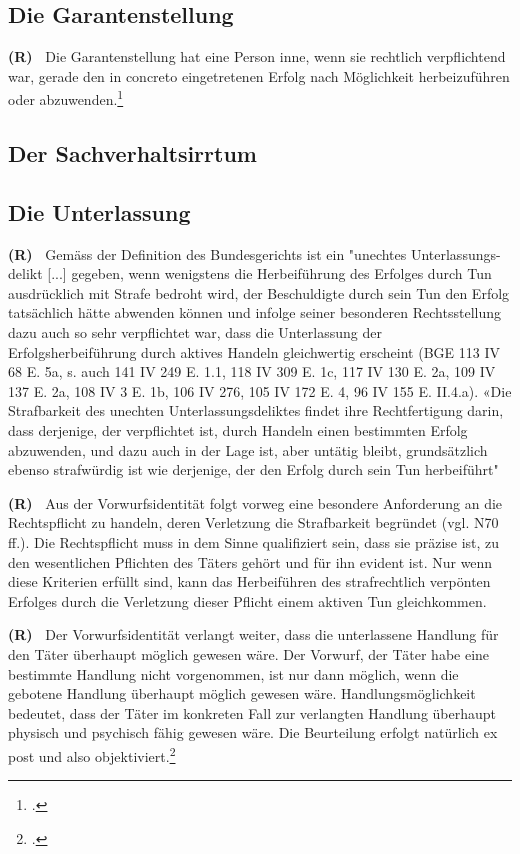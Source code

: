 \documentclass[paper=a4,fontsize=12pt, oneside, numbers=noenddot]{scrbook}
\newcounter{rz}
\newcommand{\Rz}{
	\addtocounter{rz}{1}\textbf{(R\arabic{rz})~}
}
\begin{document}
\subsection{Die Garantenstellung}\label{Recht:Garantenstellung}
\Rz Die Garantenstellung hat eine Person inne, wenn sie rechtlich verpflichtend war, gerade den in concreto eingetretenen Erfolg nach Möglichkeit herbeizuführen oder abzuwenden.\footcite[Art. 11, Rz 11]{2021:Trechsler:StGBPraxisK}  

\subsection{Der Sachverhaltsirrtum}

\subsection{Die Unterlassung}\label{Recht:Unterlassung}
\Rz Gemäss der Definition des Bundesgerichts ist ein "unechtes Unterlassungs- delikt [...] gegeben, wenn wenigstens die Herbeiführung des Erfolges durch Tun ausdrücklich mit Strafe bedroht wird, der Beschuldigte durch sein Tun den Erfolg tatsächlich hätte abwenden können und infolge seiner besonderen Rechtsstellung dazu auch so sehr verpflichtet war, dass die Unterlassung der Erfolgsherbeiführung durch aktives Handeln gleichwertig erscheint (BGE 113 IV 68 E. 5a, s. auch 141 IV 249 E. 1.1, 118 IV 309 E. 1c, 117 IV 130 E. 2a, 109 IV 137 E. 2a, 108 IV 3 E. 1b, 106 IV 276, 105 IV 172 E. 4, 96 IV 155 E. II.4.a). «Die Strafbarkeit des unechten Unterlassungsdeliktes findet ihre Rechtfertigung darin, dass derjenige, der verpflichtet ist, durch Handeln einen bestimmten Erfolg abzuwenden, und dazu auch in der Lage ist, aber untätig bleibt, grundsätzlich ebenso strafwürdig ist wie derjenige, der den Erfolg durch sein Tun herbeiführt" 

\Rz Aus der Vorwurfsidentität folgt vorweg eine besondere Anforderung an die Rechtspflicht zu handeln, deren Verletzung die Strafbarkeit begründet (vgl. N70 ff.). Die Rechtspflicht muss in dem Sinne qualifiziert sein, dass sie präzise ist, zu den wesentlichen Pflichten des Täters gehört und für ihn evident ist. Nur wenn diese Kriterien erfüllt sind, kann das Herbeiführen des strafrechtlich verpönten Erfolges durch die Verletzung dieser Pflicht einem aktiven Tun gleichkommen.

\Rz Der Vorwurfsidentität verlangt weiter, dass die unterlassene Handlung für den Täter überhaupt möglich gewesen wäre. Der Vorwurf, der Täter habe eine bestimmte Handlung nicht vorgenommen, ist nur dann möglich, wenn die gebotene Handlung überhaupt möglich gewesen wäre. Handlungsmöglichkeit bedeutet, dass der Täter im konkreten Fall zur verlangten Handlung überhaupt physisch und psychisch fähig gewesen wäre. Die Beurteilung erfolgt natürlich ex post und also objektiviert.\footcite[Art. 11, Rz 120]{2019:Niggli:BSKStGB}
\end{document}
